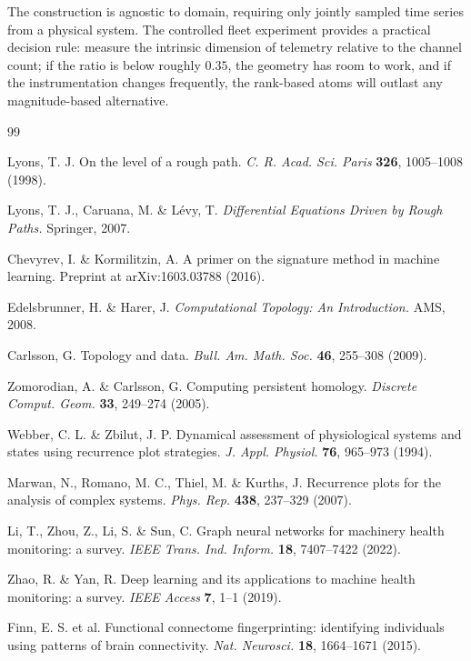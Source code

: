\documentclass[11pt]{article}
\begin{document}
The construction is agnostic to domain, requiring only jointly sampled time
series from a physical system. The controlled fleet experiment provides a
practical decision rule: measure the intrinsic dimension of telemetry relative
to the channel count; if the ratio is below roughly $0.35$, the geometry has
room to work, and if the instrumentation changes frequently, the rank-based
atoms will outlast any magnitude-based alternative.

\begin{thebibliography}{99}

 Lyons, T. J. On the level of a rough path.
\emph{C. R. Acad. Sci. Paris} \textbf{326}, 1005--1008 (1998).

 Lyons, T. J., Caruana, M. \& L\'evy, T.
\emph{Differential Equations Driven by Rough Paths.} Springer, 2007.

 Chevyrev, I. \& Kormilitzin, A. A primer on the
signature method in machine learning. Preprint at
arXiv:1603.03788 (2016).

 Edelsbrunner, H. \& Harer, J.
\emph{Computational Topology: An Introduction.} AMS, 2008.

 Carlsson, G. Topology and data.
\emph{Bull. Am. Math. Soc.} \textbf{46}, 255--308 (2009).

 Zomorodian, A. \& Carlsson, G. Computing persistent
homology. \emph{Discrete Comput. Geom.} \textbf{33}, 249--274 (2005).

 Webber, C. L. \& Zbilut, J. P. Dynamical assessment of
physiological systems and states using recurrence plot strategies.
\emph{J. Appl. Physiol.} \textbf{76}, 965--973 (1994).

 Marwan, N., Romano, M. C., Thiel, M. \& Kurths, J.
Recurrence plots for the analysis of complex systems.
\emph{Phys. Rep.} \textbf{438}, 237--329 (2007).

 Li, T., Zhou, Z., Li, S. \& Sun, C. Graph neural
networks for machinery health monitoring: a survey.
\emph{IEEE Trans. Ind. Inform.} \textbf{18}, 7407--7422 (2022).

 Zhao, R. \& Yan, R. Deep learning and its applications to
machine health monitoring: a survey. \emph{IEEE Access} \textbf{7}, 1--1
(2019).

 Finn, E. S. et al. Functional connectome fingerprinting:
identifying individuals using patterns of brain connectivity.
\emph{Nat. Neurosci.} \textbf{18}, 1664--1671 (2015).


\end{thebibliography}
\end{document}
